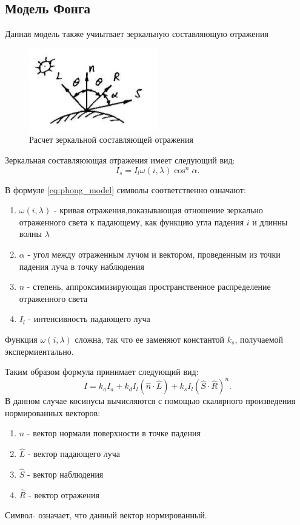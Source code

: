 \documentclass[a4paper,14pt, unknownkeysallowed]{extreport}
\begin{document}
\subsection{Модель Фонга}
Данная модель также учиытвает зеркальную составляющую отражения
\begin{figure}[h]
	\centering
	\includegraphics{phong_model}
	\caption{Расчет зеркальной составляющей отражения}
	\label{fig:phong_model}
\end{figure}
\newline
Зеркальная составляюющая отражения имеет следующий вид:
\begin{equation} 
	I_s = I_l\omega(i,\lambda)\cos^n \alpha.
	\label{eq:phong_model}
\end{equation}

В формуле \ref{eq:phong_model} символы соответственно означают:
\begin{enumerate} 
	\item $\omega(i,\lambda)$ - кривая отражения,показывающая отношение зеркально отраженного света к падающему, как функцию угла падения $i$ и длинны волны $\lambda$
	\item $\alpha$ - угол между отраженным лучом и вектором, проведенным из точки падения луча в точку наблюдения 
	\item $n$ - степень, аппроксимизирующая пространственное распределение отраженного света
	\item $I_l$ - интенсивность падающего луча
\end{enumerate}
Функция $\omega(i,\lambda)$ сложна, так что ее заменяют константой $k_s$, получаемой экспермиентально.


Таким образом формула принимает следующий вид:
\begin{equation} 
	I = k_aI_a + k_dI_{l}(\hat{n} \cdot \hat{L}) + k_s  I_{l}(\hat{S} \cdot \hat{R})^n.
\end{equation}
В данном случае косинусы вычисляются с помощью скалярного произведения нормированных векторов:
\begin{enumerate}
	\item $\hat{n}$ - вектор нормали поверхности в точке падения
	\item $\hat{L}$ - вектор падающего луча
	\item $\hat{S}$ - вектор наблюдения
	\item $\hat{R}$ - вектор отражения
\end{enumerate}
Символ $\hat{}$ означает, что данный вектор нормированный.\cite{Rodgers}
\end{document}
